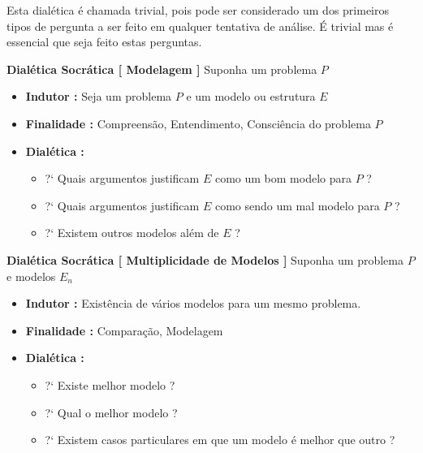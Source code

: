 \documentclass[10pt,a4paper]{report}
\begin{document}
Esta dialética é chamada trivial, pois pode ser considerado um dos primeiros tipos de pergunta a ser feito em qualquer tentativa de análise. É trivial mas é essencial que seja feito estas perguntas.




\hspace{\baselineskip}

\textbf{Dialética Socrática [ Modelagem ]} Suponha um problema $P$

\begin{itemize}
	\item[ ] \textbf{Indutor :} Seja um problema $P$ e um modelo ou estrutura $E$
	\item[ ] \textbf{Finalidade :} Compreensão, Entendimento, Consciência do problema $P$	
	\item[ ] \textbf{Dialética :}
	\begin{itemize}
		\item[ ] ?` Quais argumentos justificam $E$ como um bom modelo para $P$ ?
		\item[ ] ?` Quais argumentos justificam $E$ como sendo um mal modelo para $P$ ?
		\item[ ] ?` Existem outros modelos além de $E$ ?
	\end{itemize}
\end{itemize}

\hspace{\baselineskip}

\textbf{Dialética Socrática [ Multiplicidade de Modelos ]} Suponha um problema $P$ e modelos $E_n$

\begin{itemize}
	\item[ ] \textbf{Indutor :} Existência de vários modelos para um mesmo problema.
	\item[ ] \textbf{Finalidade :} Comparação, Modelagem
	\item[ ] \textbf{Dialética :}
	\begin{itemize}
		\item[ ] ?` Existe melhor modelo ?
		\item[ ] ?` Qual o melhor modelo ?
		\item[ ] ?` Existem casos particulares em que um modelo é melhor que outro ?
	\end{itemize}
\end{itemize}
\end{document}
